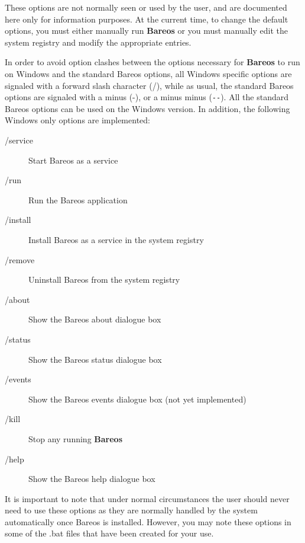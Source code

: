 These options are not normally seen or used by the user, and are documented
here only for information purposes. At the current time, to change the default
options, you must either manually run {\bf Bareos} or you must manually edit
the system registry and modify the appropriate entries.

In order to avoid option clashes between the options necessary for {\bf
Bareos} to run on Windows and the standard Bareos options, all Windows
specific options are signaled with a forward slash character (/), while as
usual, the standard Bareos options are signaled with a minus (-), or a minus
minus (\verb:--:). All the standard Bareos options can be used on the Windows
version. In addition, the following Windows only options are implemented:

\begin{description}

\item [/service ]
   Start Bareos as a service

\item [/run ]
   Run the Bareos application

\item [/install ]
   Install Bareos as a service in the system registry

\item [/remove ]
   Uninstall Bareos from the system registry

\item [/about ]
   Show the Bareos about dialogue box

\item [/status ]
   Show the Bareos status dialogue box

\item [/events ]
   Show the Bareos events dialogue box (not  yet implemented)

\item [/kill ]
   Stop any running {\bf Bareos}

\item [/help ]
   Show the Bareos help dialogue box
\end{description}


It is important to note that under normal circumstances the user should never
need to use these options as they are normally handled by the system
automatically once Bareos is installed. However, you may note these options in
some of the .bat files that have been created for your use.
